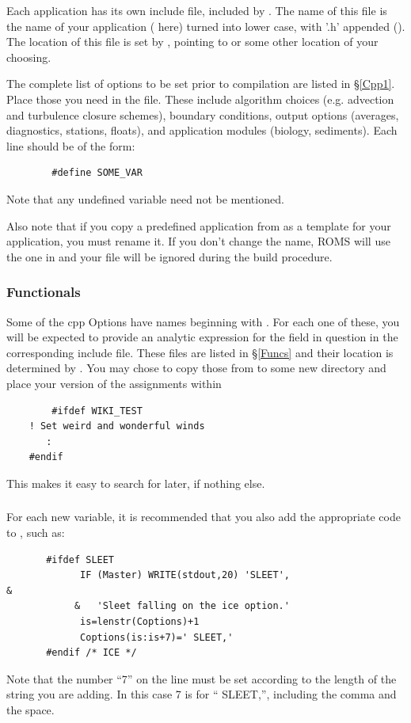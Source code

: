 Each application has its own include file, included by
. The name of this file is the name of your
application ( here) turned into lower case, with '.h'
appended (). The location of this file is set by
, pointing to  or some other
location of your choosing.

The complete list of options to be set prior to compilation are listed in
\S\ref{Cpp1}. Place those you need in the  file. These
include algorithm choices (e.g. advection and turbulence closure schemes),
boundary conditions, output options (averages, diagnostics, stations,
floats), and application modules (biology, sediments). Each line should
be of the form:
\begin{verbatim}
        #define SOME_VAR
\end{verbatim}
Note that any undefined variable need not be mentioned.

Also note that if you copy a predefined application from
 as a template for your application, you must
rename it. If you don't change the name, ROMS will use the one in
 and your file will be ignored during the build
procedure.

\subsubsection{Functionals}

Some of the cpp Options have names beginning with . For each one of
these, you will be expected to provide an analytic expression for the field
in question in the corresponding include file. These files
are listed in \S\ref{Funcs} and their location is determined
by . You may chose to copy those from
 to some new directory and place your version of
the assignments within
\begin{verbatim}
        #ifdef WIKI_TEST
	! Set weird and wonderful winds
	   :
	#endif
\end{verbatim}
This makes
it easy to search for later, if nothing else.

\subsubsection{}

For each new  variable, it is recommended that you also
add the appropriate code to , such as:
\begin{verbatim}
       #ifdef SLEET
             IF (Master) WRITE(stdout,20) 'SLEET',                      &
            &   'Sleet falling on the ice option.'
             is=lenstr(Coptions)+1
             Coptions(is:is+7)=' SLEET,'
       #endif /* ICE */
\end{verbatim}
Note that the number ``7'' on the  line must be set
according to the length of the string you are adding.  In this case 7
is for `` SLEET,'', including the comma and the space.

